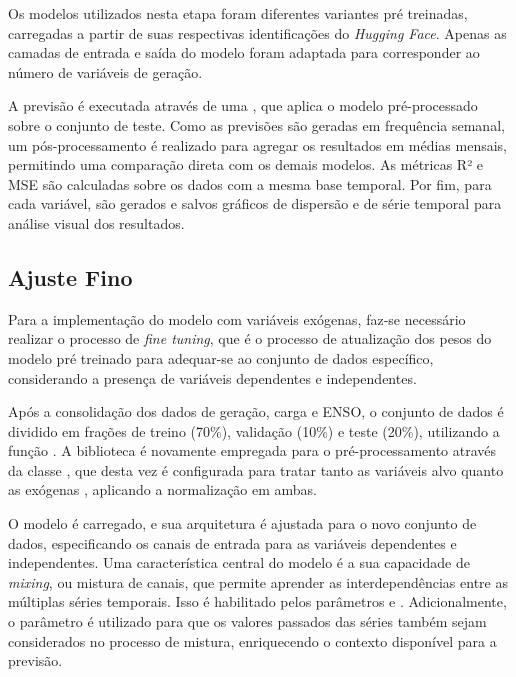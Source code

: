 Os modelos  utilizados nesta etapa foram diferentes variantes pré treinadas, carregadas a partir
de suas respectivas identificações do \textit{Hugging Face}. Apenas as camadas de entrada e saída do modelo foram adaptada 
para corresponder ao número de variáveis de geração.

A previsão é executada através de uma , que aplica o modelo pré-processado sobre o conjunto 
de teste. Como as previsões são geradas em frequência semanal, um pós-processamento é realizado para agregar os resultados em 
médias mensais, permitindo uma comparação direta com os demais modelos. As métricas R² e MSE são calculadas sobre os dados 
com a mesma base temporal. Por fim, para cada variável, são gerados e salvos gráficos de dispersão e de série temporal para 
análise visual dos resultados.


\subsection{Ajuste Fino} %
Para a implementação do modelo com variáveis exógenas, faz-se necessário realizar o processo de \textit{fine tuning}, que 
é o processo de atualização dos pesos do modelo pré treinado para adequar-se ao conjunto de dados específico, considerando
a presença de variáveis dependentes e independentes.

Após a consolidação dos dados de geração, carga e ENSO, o conjunto de dados é dividido em frações de treino (70\%), validação 
(10\%) e teste (20\%), utilizando a função . A biblioteca  é novamente empregada 
para o pré-processamento através da classe , que desta vez é configurada para tratar tanto as variáveis 
alvo  quanto as exógenas , aplicando a normalização  em ambas.

O modelo  é carregado, e sua arquitetura é ajustada para o novo conjunto de dados, especificando 
os canais de entrada para as variáveis dependentes e independentes. Uma característica central do modelo é a sua capacidade de 
\textit{mixing}, ou mistura de canais, que permite aprender as interdependências entre as múltiplas séries temporais. Isso é 
habilitado pelos parâmetros  e . Adicionalmente, 
o parâmetro  é utilizado para que os valores passados das séries também sejam considerados no processo 
de mistura, enriquecendo o contexto disponível para a previsão.

